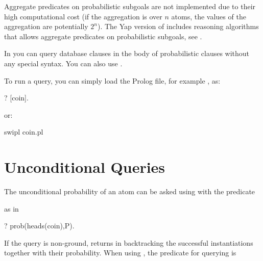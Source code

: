 \documentclass[letterpaper,10pt,english]{sphinxmanual}
\begin{document}
Aggregate predicates on probabilistic subgoals are not implemented due to their high computational cost (if the aggregation is over \(n\) atoms, the values of the aggregation are potentially \(2^n\)).
The Yap version of  includes reasoning algorithms that allows aggregate predicates on probabilistic subgoals, see .

In  you can query database clauses in the body of probabilistic clauses without any special syntax.
You can also use .

To run a query, you can simply load the Prolog file, for example , as:

\begin{sphinxVerbatim}[commandchars=\\\{\}]
?\PYGZhy{} [coin].
\end{sphinxVerbatim}

or:

\begin{sphinxVerbatim}[commandchars=\\\{\}]
\PYGZdl{} swipl coin.pl
\end{sphinxVerbatim}


\section{Unconditional Queries}
\label{\detokenize{index:unconditional-queries}}
The unconditional probability of an atom can be asked using  with the predicate

\begin{sphinxVerbatim}[commandchars=\\\{\}]
  
\end{sphinxVerbatim}

as in

\begin{sphinxVerbatim}[commandchars=\\\{\}]
?\PYGZhy{} prob(heads(coin),P).
\end{sphinxVerbatim}

If the query is non-ground,  returns in backtracking the successful instantiations together with their probability.
When using , the predicate for querying is
\end{document}
